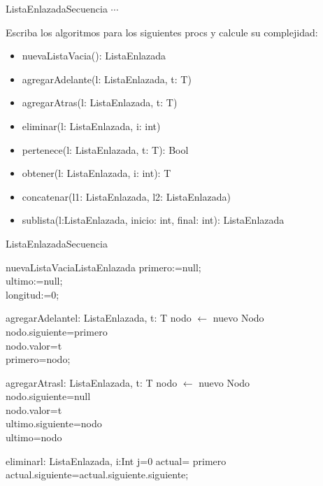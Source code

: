 \documentclass[a4paper,10pt]{article}
\begin{document}
\begin{design}{ListaEnlazada}{Secuencia}
    {\LARGE $\cdots$}
\end{design}
Escriba los algoritmos para los siguientes procs y calcule su complejidad:
\begin{itemize}
    \item nuevaListaVacia(): ListaEnlazada
    \item agregarAdelante(\Inout l: ListaEnlazada, \In t: T)
    \item agregarAtras(\Inout l: ListaEnlazada, \In t: T)
    \item eliminar(\Inout l: ListaEnlazada, \In i: int)
    \item pertenece(\In l: ListaEnlazada, \In t: T): Bool
    \item obtener(\In l: ListaEnlazada, \In i: int): T
    \item concatenar(\Inout l1: ListaEnlazada, \In l2: ListaEnlazada)
    \item sublista(\In l:ListaEnlazada, \In inicio: int, \In final: int): ListaEnlazada
\end{itemize}

\begin{design}{ListaEnlazada}{Secuencia}
    \begin{impl}{nuevaListaVacia}{}{ListaEnlazada}
        primero:=null;
        \\ultimo:=null;
        \\longitud:=0;
    \end{impl}
    \begin{impl}{agregarAdelante}{\Inout l: ListaEnlazada, \In t: T}{}
        nodo $\leftarrow$ nuevo Nodo
        \\nodo.siguiente=primero
        \\nodo.valor=t
        \\primero=nodo;
    \end{impl}
    \begin{impl}{agregarAtras}{\Inout l: ListaEnlazada, \In t: T}{}
        nodo $\leftarrow$ nuevo Nodo
        \\nodo.siguiente=null
        \\nodo.valor=t
        \\ultimo.siguiente=nodo
        \\ultimo=nodo
    \end{impl}
    \begin{impl}{eliminar}{\Inout l: ListaEnlazada, \In i:Int}{}
        j=0
        actual= primero
        actual.siguiente=actual.siguiente.siguiente;
    \end{impl}
\end{design}
\end{document}

